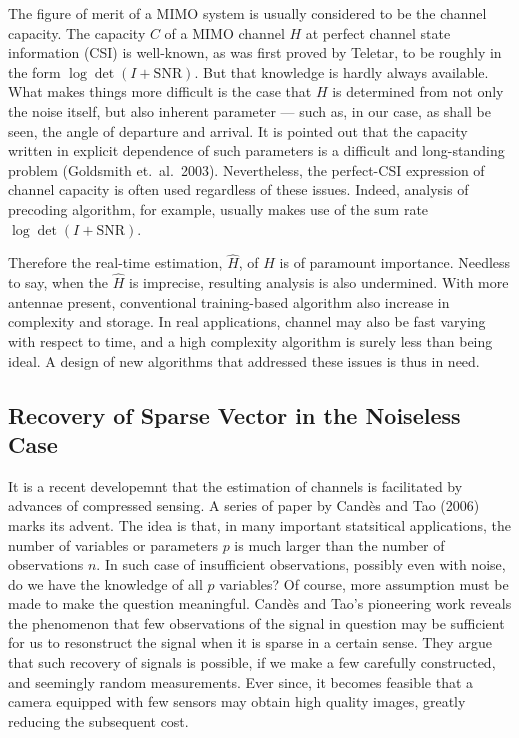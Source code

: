 \documentclass[12pt]{article}
\begin{document}
The figure of merit of a MIMO system is usually considered to be the channel capacity.
The capacity \(C\) of a MIMO channel \(H\) at perfect channel state information (CSI) is well-known, as was first proved by Teletar, to be roughly in the form \(\log \det (I +\mathrm{SNR})\).
But that knowledge is hardly always available.
What makes things more difficult is the case that \(H\) is determined from not only the noise itself, but also inherent parameter --- such as, in our case, as shall be seen, the angle of departure and arrival.
It is pointed out that the capacity written in explicit dependence of such parameters is a difficult and long-standing problem (Goldsmith et.\ al.\ 2003).
Nevertheless, the perfect-CSI expression of channel capacity is often used regardless of these issues.
Indeed, analysis of precoding algorithm, for example, usually makes use of the sum rate \(\log \det (I +\mathrm{SNR})\).

Therefore the real-time estimation, \(\hat{H}\), of \(H\) is of paramount importance.
Needless to say, when the \(\hat{H}\) is imprecise, resulting analysis is also undermined.
With more antennae present, conventional training-based algorithm also increase in complexity and storage.
In real applications, channel may also be fast varying with respect to time, and a high complexity algorithm is surely less than being ideal.
A design of new algorithms that addressed these issues is thus in need.


\subsection{Recovery of Sparse Vector in the Noiseless Case}

It is a recent developemnt that the estimation of channels is facilitated by advances of compressed sensing.
A series of paper by Cand\`es and Tao (2006) marks its advent.
The idea is that, in many important statsitical applications, the number of variables or parameters \(p\) is much larger than the number of observations \(n\).
In such case of insufficient observations, possibly even with noise, do we have the knowledge of all \(p\) variables?
Of course, more assumption must be made to make the question meaningful.
Cand\`es and Tao's pioneering work reveals the phenomenon that few observations of the signal in question may be sufficient for us to resonstruct the signal when it is sparse in a certain sense.
They argue that such recovery of signals is possible, if we make a few carefully constructed, and seemingly random measurements.
Ever since, it becomes feasible that a camera equipped with few sensors may obtain high quality images, greatly reducing the subsequent cost.
\end{document}
